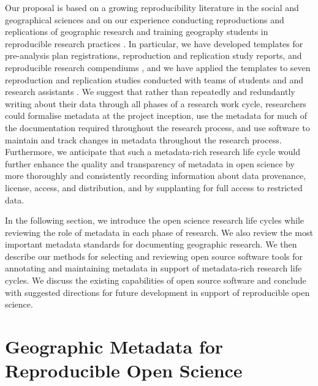 \documentclass{isprs} %
\begin{document}
Our proposal is based on a growing reproducibility literature in the social and geographical sciences and on our experience conducting reproductions and replications of geographic research and training geography students in reproducible research practices \citep{Kedron_Holler_Bardin_Hilgendorf_2022}.
In particular, we have developed templates for pre-analysis plan registrations, reproduction and replication study reports, and reproducible research compendiums \citep{Kedron_Holler_2022}, and we have applied the templates to seven reproduction and replication studies conducted with teams of students and and research assistants \citep{Kedron_Holler_Bardin_Hilgendorf_2022}.
We suggest that rather than repeatedly and redundantly writing about their data through all phases of a research work cycle, researchers could formalise metadata at the project inception, use the metadata for much of the documentation required throughout the research process, and use software to maintain and track changes in metadata throughout the research process.
Furthermore, we anticipate that such a metadata-rich research life cycle would further enhance the quality and transparency of metadata in open science by more thoroughly and consistently recording information about data provenance, license, access, and distribution, and by supplanting for full access to restricted data.

In the following section, we introduce the open science research life cycles while reviewing the role of metadata in each phase of research.
We also review the most important metadata standards for documenting geographic research.
We then describe our methods for selecting and reviewing open source software tools for annotating and maintaining metadata in support of metadata-rich research life cycles.
We discuss the existing capabilities of open source software and conclude with suggested directions for future development in support of reproducible open science.

\section{Geographic Metadata for Reproducible Open Science}\label{sec:Background}
\end{document}
